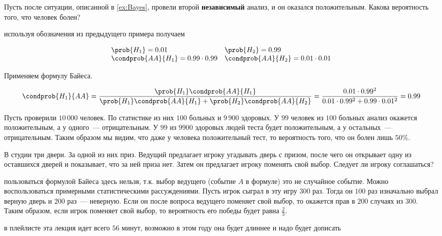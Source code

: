 \begin{example}
  Пусть после ситуации, описанной в \ref{ex:Bayes}, провели второй
  \textbf{независимый} анализ, и он оказался положительным. Какова вероятность
  того, что человек болен?

  \solution{} используя обозначения из предыдущего примера получаем

  \begin{equation*}
    \begin{array}{ll}
      \prob{H_1} = 0.01
      &
      \prob{H_2} = 0.99
    \\
      \condprob{A A}{H_1} = 0.99 \cdot 0.99
      &
      \condprob{A A}{H_2} = 0.01 \cdot 0.01
    \end{array}
  \end{equation*}

  Применяем формулу Байеса.

  \begin{equation*}
    \condprob{H_1}{A A}
    = \frac{\prob{H_1} \condprob{A A}{H_1}}
      {\prob{H_1} \condprob{A A}{H_1} + \prob{H_2} \condprob{A A}{H_2}}
    = \frac{0.01 \cdot 0.99^2}{0.01 \cdot 0.99^2 + 0.99 \cdot 0.01^2}
    = 0.99
  \end{equation*}
\end{example}


Пусть проверили \(10\,000\) человек. По статистике из них \(100\) больных и
\(9\,900\) здоровых. У \(99\) человек из \(100\) больных анализ окажется
положительным, а у одного~--- отрицательным. У \(99\) из \(9900\) здоровых людей
теста будет положительным, а у остальных~--- отрицательным. Таким образом мы
видим, что даже у человека положительный тест, то вероятность того, что он болен
лишь \(50\)\%.

\begin{example}
  В студии три двери. За одной из них приз. Ведущий предлагает игроку
  угадывать дверь с призом, после чего он открывает одну из оставшихся дверей
  и показывает, что за ней приза нет. Затем он предлагает игроку поменять свой
  выбор. Следует ли игроку соглашаться?

  \solution{} пользоваться формулой Байеса здесь нельзя, т.к. выбор ведущего
  (событие \(A\) в формуле) это не случайное событие. Можно воспользоваться
  примерными статистическими рассуждениями. Пусть игрок сыграл в эту игру
  \(300\) раз. Тогда он \(100\) раз изначально выбрал верную дверь и \(200\)
  раз~--- неверную. Если он после вопроса ведущего поменяет свой выбор, то
  окажется прав в \(200\) случаях из \(300\). Таким образом, если игрок поменяет
  свой выбор, то вероятность его победы будет равна \(\frac{2}{3}\).
\end{example}

\todo в плейлисте эта лекция идет всего \(56\) минут, возможно в этом году она
будет длиннее и надо будет дописать

